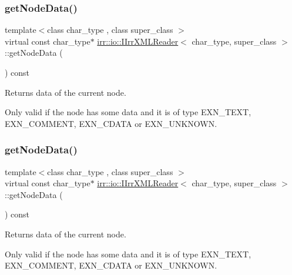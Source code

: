 \subsubsection{\texorpdfstring{get\+Node\+Data()}{getNodeData()}\hspace{0.1cm}{\footnotesize\ttfamily [1/2]}}
{\footnotesize\ttfamily template$<$class char\+\_\+type , class super\+\_\+class $>$ \\
virtual const char\+\_\+type$\ast$ \hyperlink{classirr_1_1io_1_1IIrrXMLReader}{irr\+::io\+::\+I\+Irr\+X\+M\+L\+Reader}$<$ char\+\_\+type, super\+\_\+class $>$\+::get\+Node\+Data (\begin{DoxyParamCaption}{ }\end{DoxyParamCaption}) const\hspace{0.3cm}{\ttfamily [pure virtual]}}



Returns data of the current node. 

Only valid if the node has some data and it is of type E\+X\+N\+\_\+\+T\+E\+XT, E\+X\+N\+\_\+\+C\+O\+M\+M\+E\+NT, E\+X\+N\+\_\+\+C\+D\+A\+TA or E\+X\+N\+\_\+\+U\+N\+K\+N\+O\+WN. \mbox{\label{classirr_1_1io_1_1IIrrXMLReader_aecbe0698e8f9acf88e27dd53da984210}} 
\subsubsection{\texorpdfstring{get\+Node\+Data()}{getNodeData()}\hspace{0.1cm}{\footnotesize\ttfamily [2/2]}}
{\footnotesize\ttfamily template$<$class char\+\_\+type , class super\+\_\+class $>$ \\
virtual const char\+\_\+type$\ast$ \hyperlink{classirr_1_1io_1_1IIrrXMLReader}{irr\+::io\+::\+I\+Irr\+X\+M\+L\+Reader}$<$ char\+\_\+type, super\+\_\+class $>$\+::get\+Node\+Data (\begin{DoxyParamCaption}{ }\end{DoxyParamCaption}) const\hspace{0.3cm}{\ttfamily [pure virtual]}}



Returns data of the current node. 

Only valid if the node has some data and it is of type E\+X\+N\+\_\+\+T\+E\+XT, E\+X\+N\+\_\+\+C\+O\+M\+M\+E\+NT, E\+X\+N\+\_\+\+C\+D\+A\+TA or E\+X\+N\+\_\+\+U\+N\+K\+N\+O\+WN. \mbox{\label{classirr_1_1io_1_1IIrrXMLReader_a7d745b130c895d0f910f191d04e20e87}} 
